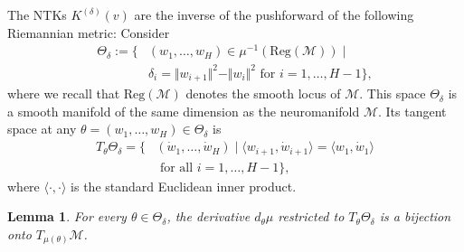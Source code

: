\documentclass[twoside]{article}
\newtheorem{lemma}[theorem]{Lemma}
\theoremstyle{definition}
\theoremstyle{remark}
\begin{document}
The NTKs $K^{(\delta)}(v)$ are the inverse of the pushforward of the following Riemannian metric: 
Consider \begin{align*}
    \Theta_\delta := \{ & (w_1, \ldots, w_H) \in  \mu^{-1}(\mathrm{Reg}(\mathcal{M})) \mid \\ &
      \delta_i = \Vert w_{i+1} \Vert^2 - \Vert w_i \Vert^2 \text{ for } i = 1, \ldots, H-1\},
\end{align*}
where we recall that $\mathrm{Reg}(\mathcal{M})$ denotes the smooth locus of $\mathcal{M}$.
This space $\Theta_\delta$ is a smooth manifold of the same dimension as the neuromanifold $\mathcal{M}$.
Its tangent space at any $\theta = (w_1, \ldots, w_H) \in \Theta_\delta$ 
is  
\begin{align}\label{eq:tangentDelta}
    T_\theta \Theta_\delta = \{ &(\dot w_1, \ldots, \dot w_H) \mid \langle w_{i+1},\dot w_{i+1}  \rangle = \langle w_1, \dot w_1 \rangle \nonumber \\ & \text{ for all } i = 1, \ldots, H-1 \},
\end{align}
where $\langle \cdot, \cdot \rangle$ is the standard Euclidean inner product.
\begin{lemma}\label{lem:submersion}
	For every $\theta \in \Theta_\delta$, the derivative $d_{\theta}\mu$ restricted to %
    $T_\theta \Theta_\delta$ is a bijection onto $T_{\mu(\theta)} \mathcal{M}$.
\end{lemma}
	
	
\end{document}
